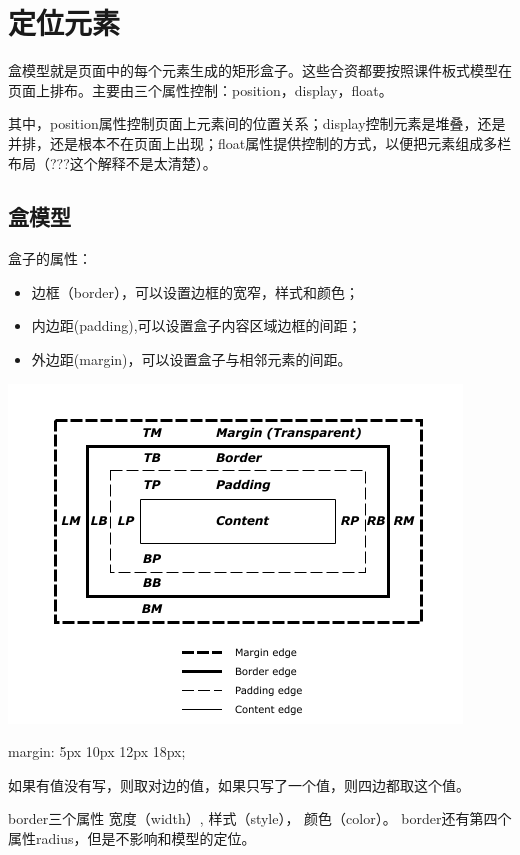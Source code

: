 \section{定位元素}

盒模型就是页面中的每个元素生成的矩形盒子。这些合资都要按照课件板式模型在页面上排布。主要由三个属性控制：position，display，float。

其中，position属性控制页面上元素间的位置关系；display控制元素是堆叠，还是并排，还是根本不在页面上出现；float属性提供控制的方式，以便把元素组成多栏布局（???这个解释不是太清楚）。

\subsection{盒模型}

盒子的属性：
\begin{itemize}
\item 边框（border），可以设置边框的宽窄，样式和颜色；
\item 内边距(padding),可以设置盒子内容区域边框的间距；
\item 外边距(margin)，可以设置盒子与相邻元素的间距。
\end{itemize}

\includegraphics[scale=1]{css/resources/box-mode.png}


\begin{CSS}[上 右 下 左]
{margin: 5px 10px 12px 18px;}
\end{CSS}

如果有值没有写，则取对边的值，如果只写了一个值，则四边都取这个值。


border三个属性 宽度（width）, 样式（style）， 颜色（color）。 border还有第四个属性radius，但是不影响和模型的定位。

